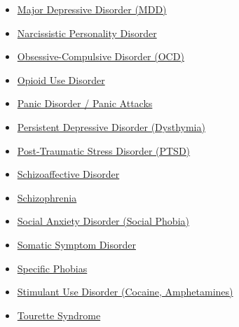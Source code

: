 \begin{itemize}[noitemsep]
  \item \hyperlink{sec:Major Depressive Disorder (MDD)}{Major Depressive Disorder (MDD)}
  \item \hyperlink{sec:Narcissistic Personality Disorder}{Narcissistic Personality Disorder}
  \item \hyperlink{sec:Obsessive-Compulsive Disorder (OCD)}{Obsessive-Compulsive Disorder (OCD)}
  \item \hyperlink{sec:Opioid Use Disorder}{Opioid Use Disorder}
  \item \hyperlink{sec:Panic Disorder / Panic Attacks}{Panic Disorder / Panic Attacks}
  \item \hyperlink{sec:Persistent Depressive Disorder (Dysthymia)}{Persistent Depressive Disorder (Dysthymia)}
  \item \hyperlink{sec:Post-Traumatic Stress Disorder (PTSD)}{Post-Traumatic Stress Disorder (PTSD)}
  \item \hyperlink{sec:Schizoaffective Disorder}{Schizoaffective Disorder}
  \item \hyperlink{sec:Schizophrenia}{Schizophrenia}
  \item \hyperlink{sec:Social Anxiety Disorder (Social Phobia)}{Social Anxiety Disorder (Social Phobia)}
  \item \hyperlink{sec:Somatic Symptom Disorder}{Somatic Symptom Disorder}
  \item \hyperlink{sec:Specific Phobias}{Specific Phobias}
  \item \hyperlink{sec:Stimulant Use Disorder (Cocaine, Amphetamines)}{Stimulant Use Disorder (Cocaine, Amphetamines)}
  \item \hyperlink{sec:Tourette Syndrome}{Tourette Syndrome}
\end{itemize}

